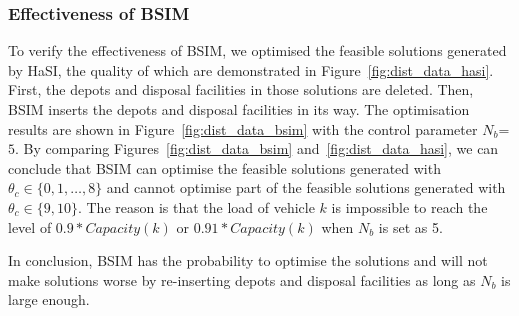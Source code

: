 \documentclass[journal]{IEEEtran}
\newcommand\lwx[1]{\textcolor{magenta}{#1}}
\begin{document}

\subsubsection{Effectiveness of BSIM}\label{sec:eff_bsim}
To verify the effectiveness of BSIM, we optimised the feasible solutions generated by HaSI, the quality of which are demonstrated in Figure~\ref{fig:dist_data_hasi}. First, the depots and disposal facilities in those solutions are deleted. Then, BSIM inserts the depots and disposal facilities in its way. The optimisation results are shown in Figure~\ref{fig:dist_data_bsim} with the control parameter $N_b$=$5$. By comparing Figures~\ref{fig:dist_data_bsim} and~\ref{fig:dist_data_hasi}, we can conclude that BSIM can optimise the feasible solutions generated with $\theta_c\in \{0,1,\dots,8\}$ and cannot optimise part of the feasible solutions generated with $\theta_c\in \{9,10\}$. The reason is that the load of vehicle $k$ is impossible to reach the level of $0.9* Capacity(k)$ or $0.91* Capacity(k)$ when $N_b$ is set as 5.


In conclusion, BSIM has the probability to optimise the solutions and will not make solutions worse by re-inserting depots and disposal facilities as long as $N_b$ is large enough.
\end{document}
